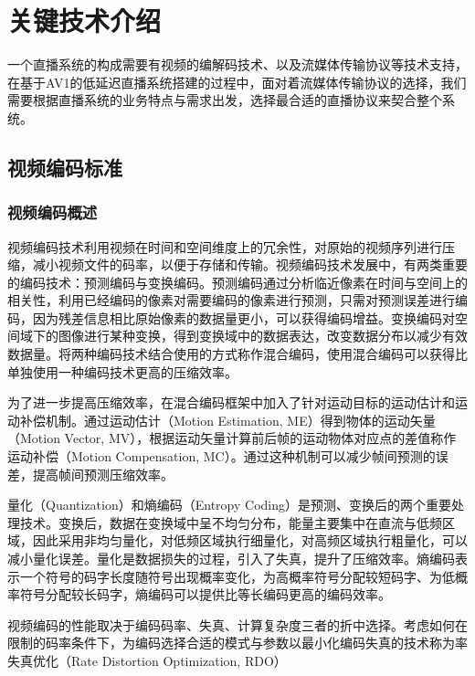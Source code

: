 
\chapter{关键技术介绍}

一个直播系统的构成需要有视频的编解码技术、以及流媒体传输协议等技术支持，在基于AV1的低延迟直播系统搭建的过程中，面对着流媒体传输协议的选择，我们需要根据直播系统的业务特点与需求出发，选择最合适的直播协议来契合整个系统。

\section{视频编码标准}

\subsection{视频编码概述}

视频编码技术利用视频在时间和空间维度上的冗余性，对原始的视频序列进行压缩，减小视频文件的码率，以便于存储和传输。视频编码技术发展中，有两类重要的编码技术：预测编码与变换编码。预测编码通过分析临近像素在时间与空间上的相关性，利用已经编码的像素对需要编码的像素进行预测，只需对预测误差进行编码，因为残差信息相比原始像素的数据量更小，可以获得编码增益。变换编码对空间域下的图像进行某种变换，得到变换域中的数据表达，改变数据分布以减少有效数据量。将两种编码技术结合使用的方式称作混合编码，使用混合编码可以获得比单独使用一种编码技术更高的压缩效率。

为了进一步提高压缩效率，在混合编码框架中加入了针对运动目标的运动估计和运动补偿机制。通过运动估计（Motion Estimation, ME）得到物体的运动矢量（Motion Vector, MV），根据运动矢量计算前后帧的运动物体对应点的差值称作运动补偿（Motion Compensation, MC）。通过这种机制可以减少帧间预测的误差，提高帧间预测压缩效率。

量化（Quantization）和熵编码（Entropy Coding）是预测、变换后的两个重要处理技术。变换后，数据在变换域中呈不均匀分布，能量主要集中在直流与低频区域，因此采用非均匀量化，对低频区域执行细量化，对高频区域执行粗量化，可以减小量化误差。量化是数据损失的过程，引入了失真，提升了压缩效率。熵编码表示一个符号的码字长度随符号出现概率变化，为高概率符号分配较短码字、为低概率符号分配较长码字，熵编码可以提供比等长编码更高的编码效率。

视频编码的性能取决于编码码率、失真、计算复杂度三者的折中选择。考虑如何在限制的码率条件下，为编码选择合适的模式与参数以最小化编码失真的技术称为率失真优化\cite{sullivanRatedistortionOptimizationVideo1998}（Rate Distortion Optimization, RDO）

